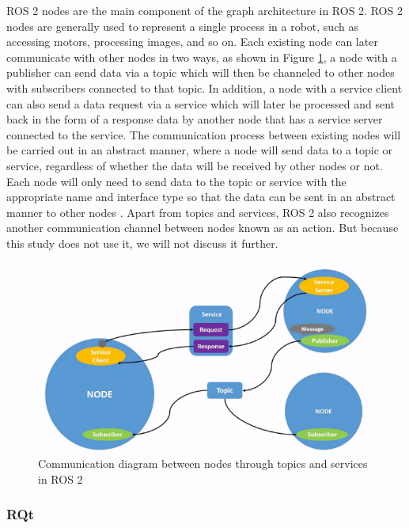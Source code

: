 ROS 2 nodes are the main component of the graph architecture in ROS 2. ROS 2 nodes are generally used to represent a single process in a robot, such as accessing motors, processing images, and so on. Each existing node can later communicate with other nodes in two ways, as shown in Figure \ref{fig:ros2node}, a node with a publisher can send data via a topic which will then be channeled to other nodes with subscribers connected to that topic.
In addition, a node with a service client can also send a data request via a service which will later be processed and sent back in the form of a response data by another node that has a service server connected to the service.
The communication process between existing nodes will be carried out in an abstract manner, where a node will send data to a topic or service, regardless of whether the data will be received by other nodes or not. Each node will only need to send data to the topic or service with the appropriate name and interface type so that the data can be sent in an abstract manner to other nodes \parencite{fikri2021}.
Apart from topics and services, ROS 2 also recognizes another communication channel between nodes known as an action. But because this study does not use it, we will not discuss it further.
\begin{figure}[ht]
  \centering
  \includegraphics[scale=1]{gambar/ros2_node.png}
  \caption{Communication diagram between nodes through topics and services in ROS 2}
  \label{fig:ros2node}
\end{figure}

\subsubsection{RQt}
\label{subsubsec:rqt}

